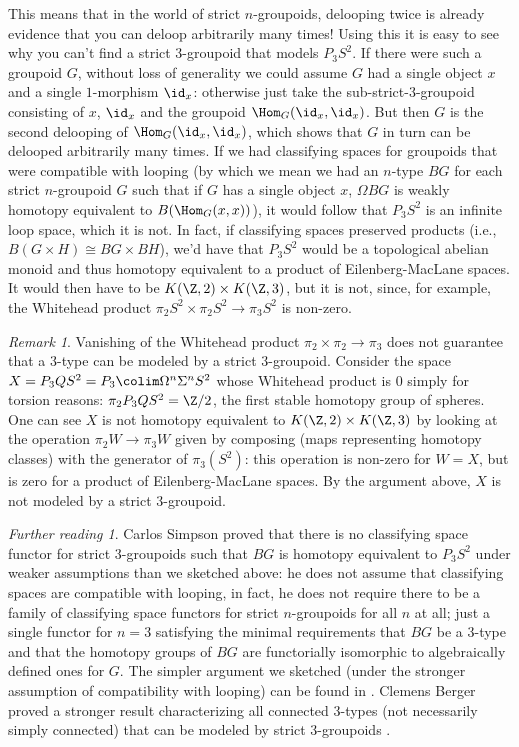 \documentclass[12pt]{amsart}
\theoremstyle{definition} \newtheorem{definition}[theorem]{Definition}
\theoremstyle{remark} \newtheorem{remark}[theorem]{Remark}
\newtheorem*{further}{Further reading}
\numberwithin{equation}{section}
\begin{document}
This means that in the world of strict $n$-groupoids, delooping twice
is already evidence that you can deloop arbitrarily many times! Using
this it is easy to see why you can't find a strict $3$-groupoid that
models $P_3 S^2$. If there were such a groupoid $G$, without loss of
generality we could assume $G$ had a single object $x$ and a single
$1$-morphism $\id_x$: otherwise just take the sub-strict-$3$-groupoid
consisting of $x$, $\id_x$ and the groupoid $\Hom_G(\id_x, \id_x)$.
But then $G$ is the second delooping of $\Hom_G(\id_x, \id_x)$, which
shows that $G$ in turn can be delooped arbitrarily many times. If we
had classifying spaces for groupoids that were compatible with looping
(by which we mean we had an $n$-type $BG$ for each strict $n$-groupoid
$G$ such that if $G$ has a single object $x$, $\Omega BG$ is weakly
homotopy equivalent to $B(\Hom_G(x,x))$), it would follow that $P_3
S^2$ is an infinite loop space, which it is not. In fact, if
classifying spaces preserved products (i.e., $B(G \times H) \cong BG
\times BH$), we'd have that $P_3 S^2$ would be a topological abelian
monoid and thus homotopy equivalent to a product of Eilenberg-MacLane
spaces. It would then have to be $K(\Z,2) \times K(\Z,3)$, but it is
not, since, for example, the Whitehead product $\pi_2 S^2 \times \pi_2
S^2 \to \pi_3 S^2$ is non-zero.

\begin{remark} Vanishing of the Whitehead product $\pi_2 \times \pi_2
\to \pi_3$ does not guarantee that a $3$-type can be modeled by a
strict $3$-groupoid. Consider the space $X = P_3 Q S^2 = P_3 \colim
\Omega^n \Sigma^n S^2$ whose Whitehead product is $0$ simply for
torsion reasons: $\pi_2 P_3QS^2 = \Z/2$, the first stable homotopy
group of spheres. One can see $X$ is not homotopy equivalent to
$K(\Z,2) \times K(\Z,3)$ by looking at the operation $\pi_2 W \to
\pi_3 W$ given by composing (maps representing homotopy classes) with
the generator of $\pi_3(S^2)$: this operation is non-zero for $W=X$,
but is zero for a product of Eilenberg-MacLane spaces. By the argument
above, $X$ is not modeled by a strict $3$-groupoid. \end{remark}

\begin{further} Carlos Simpson \cite[Section 2.7]{Simpson} proved that
there is no classifying space functor for strict $3$-groupoids such
that $BG$ is homotopy equivalent to $P_3S^2$ under weaker assumptions
than we sketched above: he does not assume that classifying spaces are
compatible with looping, in fact, he does not require there to be a
family of classifying space functors for strict $n$-groupoids for all
$n$ at all; just a single functor for $n=3$ satisfying the minimal
requirements that $BG$ be a $3$-type and that the homotopy groups of
$BG$ are functorially isomorphic to algebraically defined ones for
$G$. The simpler argument we sketched (under the stronger assumption
of compatibility with looping) can be found in \cite[Section
2.6]{Simpson}. Clemens Berger proved a stronger result characterizing
all connected $3$-types (not necessarily simply connected) that can be
modeled by strict $3$-groupoids \cite[Corollary 3.4]{Berger}.
\end{further}
\end{document}
